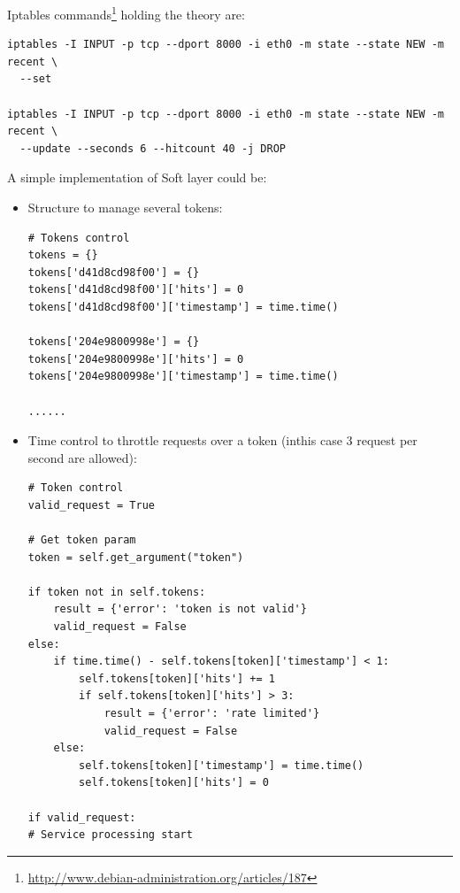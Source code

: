 \documentclass[a4paper,11pt]{article}
\begin{document}
 
 
 Iptables commands\footnote{\url{http://www.debian-administration.org/articles/187}} holding the theory are:
\begin{verbatim}
iptables -I INPUT -p tcp --dport 8000 -i eth0 -m state --state NEW -m recent \
  --set

iptables -I INPUT -p tcp --dport 8000 -i eth0 -m state --state NEW -m recent \
  --update --seconds 6 --hitcount 40 -j DROP
\end{verbatim} 
 
 A simple implementation of Soft layer could be:
 \begin{itemize}
\item Structure to manage several tokens:
\begin{verbatim}
# Tokens control
tokens = {}
tokens['d41d8cd98f00'] = {}
tokens['d41d8cd98f00']['hits'] = 0
tokens['d41d8cd98f00']['timestamp'] = time.time()

tokens['204e9800998e'] = {}
tokens['204e9800998e']['hits'] = 0
tokens['204e9800998e']['timestamp'] = time.time()

......
\end{verbatim} 


\item Time control to throttle requests over a token (inthis case 3 request per second are allowed):
 \begin{verbatim}
# Token control
valid_request = True

# Get token param
token = self.get_argument("token")

if token not in self.tokens:
    result = {'error': 'token is not valid'}
    valid_request = False
else:
    if time.time() - self.tokens[token]['timestamp'] < 1:
        self.tokens[token]['hits'] += 1
        if self.tokens[token]['hits'] > 3:
            result = {'error': 'rate limited'}
            valid_request = False
    else:
        self.tokens[token]['timestamp'] = time.time()
        self.tokens[token]['hits'] = 0

if valid_request:
# Service processing start
\end{verbatim} 
 \end{itemize}
 
 






 \newpage
\end{document}
